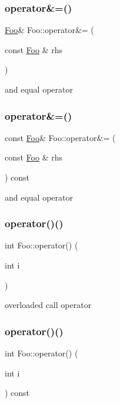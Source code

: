 \subsubsection{\texorpdfstring{operator\&=()}{operator\&=()}\hspace{0.1cm}{\footnotesize\ttfamily [1/2]}}
{\footnotesize\ttfamily \mbox{\hyperlink{struct_foo}{Foo}}\& Foo\+::operator\&= (\begin{DoxyParamCaption}\item[{const \mbox{\hyperlink{struct_foo}{Foo}} \&}]{rhs }\end{DoxyParamCaption})}

and equal operator \mbox{\label{struct_foo_ab1a2a53ad5b2a0f97422630330c151fe}} 
\subsubsection{\texorpdfstring{operator\&=()}{operator\&=()}\hspace{0.1cm}{\footnotesize\ttfamily [2/2]}}
{\footnotesize\ttfamily const \mbox{\hyperlink{struct_foo}{Foo}}\& Foo\+::operator\&= (\begin{DoxyParamCaption}\item[{const \mbox{\hyperlink{struct_foo}{Foo}} \&}]{rhs }\end{DoxyParamCaption}) const}

and equal operator \mbox{\label{struct_foo_a3a41dcf8c53f777d50676ea28400a640}} 
\subsubsection{\texorpdfstring{operator()()}{operator()()}\hspace{0.1cm}{\footnotesize\ttfamily [1/2]}}
{\footnotesize\ttfamily int Foo\+::operator() (\begin{DoxyParamCaption}\item[{int}]{i }\end{DoxyParamCaption})}

overloaded call operator \mbox{\label{struct_foo_ae3c9c1f33cdb8b932c6eb104660a262b}} 
\subsubsection{\texorpdfstring{operator()()}{operator()()}\hspace{0.1cm}{\footnotesize\ttfamily [2/2]}}
{\footnotesize\ttfamily int Foo\+::operator() (\begin{DoxyParamCaption}\item[{int}]{i }\end{DoxyParamCaption}) const}

